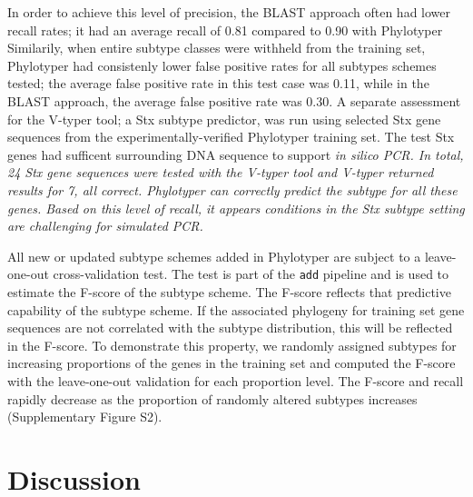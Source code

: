\documentclass{bioinfo}
\begin{document}
In order to achieve this level of precision, the BLAST approach often had lower recall rates; it had an average recall of 0.81 compared to 0.90 with Phylotyper
Similarily, when entire subtype classes were withheld from the training set, Phylotyper had consistenly lower false positive rates for all subtypes schemes tested; the average false positive rate in this test case was 0.11, while in the BLAST approach, the average false positive rate was 0.30.
A separate assessment for the V-typer tool; a Stx subtype predictor, was run using selected Stx gene sequences from the experimentally-verified Phylotyper training set.
The test Stx genes had sufficent surrounding DNA sequence to support \it{in silico} PCR.
In total, 24 Stx gene sequences were tested with the V-typer tool and V-typer returned results for 7, all correct.
Phylotyper can correctly predict the subtype for all these genes.
Based on this level of recall, it appears conditions in the Stx subtype setting are challenging for simulated PCR.

All new or updated subtype schemes added in Phylotyper are subject to a leave-one-out cross-validation test.
The test is part of the \texttt{add} pipeline and is used to estimate the F-score of the subtype scheme. 
The F-score reflects that predictive capability of the subtype scheme. 
If the associated phylogeny for training set gene sequences are not correlated with the subtype distribution, this will be reflected in the F-score. 
To demonstrate this property, we randomly assigned subtypes for increasing proportions of the genes in the training set and computed the F-score with the leave-one-out validation for each proportion level.
The F-score and recall rapidly decrease as the proportion of randomly altered subtypes increases (Supplementary Figure S2).

\section{Discussion}
\end{document}
